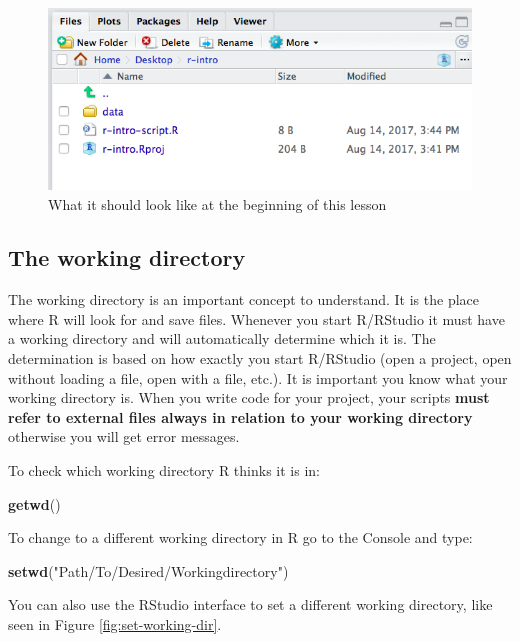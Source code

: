 \documentclass[
]{book}
\newenvironment{Shaded}{\begin{snugshade}}{\end{snugshade}}
\newcommand{\FunctionTok}[1]{\textcolor[rgb]{0.13,0.29,0.53}{\textbf{#1}}}
\newcommand{\NormalTok}[1]{#1}
\newcommand{\StringTok}[1]{\textcolor[rgb]{0.31,0.60,0.02}{#1}}
\begin{document}
\begin{figure}
\includegraphics[width=0.6\linewidth]{img/Rproject-setup} \caption{What it should look like at the beginning of this lesson}\label{fig:working-dir}
\end{figure}

\hypertarget{the-working-directory}{%
\subsection{The working directory}\label{the-working-directory}}

The working directory is an important concept to understand. It is the place where R will look for and save files. Whenever you start R/RStudio it must have a working directory and will automatically determine which it is. The determination is based on how exactly you start R/RStudio (open a project, open without loading a file, open with a file, etc.). It is important you know what your working directory is. When you write code for your project, your scripts \textbf{must refer to external files always in relation to your working directory} otherwise you will get error messages.

To check which working directory R thinks it is in:

\begin{Shaded}
\begin{Highlighting}[]
\FunctionTok{getwd}\NormalTok{()}
\end{Highlighting}
\end{Shaded}

To change to a different working directory in R go to the Console and type:

\begin{Shaded}
\begin{Highlighting}[]
\FunctionTok{setwd}\NormalTok{(}\StringTok{"Path/To/Desired/Workingdirectory"}\NormalTok{)}
\end{Highlighting}
\end{Shaded}

You can also use the RStudio interface to set a different working directory, like seen in Figure \ref{fig:set-working-dir}.
\end{document}
